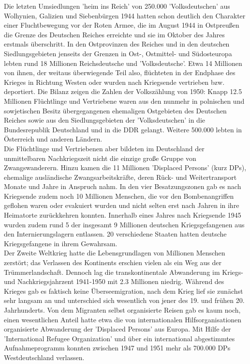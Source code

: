 \documentclass[letterpaper, 12pt]{article}
\begin{document}
Die letzten Umsiedlungen 'heim ins Reich' von 250.000 'Volksdeutschen' aus Wolhynien, Galizien und Siebenbürgen 1944 hatten schon deutlich den Charakter einer Fluchtbewegung vor der Roten Armee, die im August 1944 in Ostpreußen die Grenze des Deutschen Reiches erreichte und sie im Oktober des Jahres erstmals überschritt. In den Ostprovinzen des Reiches und in den deutschen Siedlungsgebieten jenseits der Grenzen in Ost-, Ostmittel- und Südosteuropa lebten rund 18 Millionen Reichsdeutsche und 'Volksdeutsche'. Etwa 14 Millionen von ihnen, der weitaus überwiegende Teil also, flüchteten in der Endphase des Krieges in Richtung Westen oder wurden nach Kriegsende vertrieben bzw. deportiert. Die Bilanz zeigen die Zahlen der Volkszählung von 1950: Knapp 12.5 Millionen Flüchtlinge und Vertriebene waren aus den nunmehr in polnischen und sowjetischen Besitz übergegangenen ehemaligen Ostgebieten des Deutschen Reiches sowie aus den Siedlungsgebieten der 'Volksdeutschen' in die Bundesrepublik Deutschland und in die DDR gelangt. Weitere 500.000 lebten in Österreich und anderen Ländern. \\
Die Flüchtlinge und Vertriebenen aber bildeten im Deutschland der unmittelbaren Nachkriegszeit nicht die einzige große Gruppe von Zwangswanderern. Hinzu kamen die 11 Millionen 'Displaced Persons' (kurz DPs), ehemalige ausländische Zwangsarbeitskräfte, deren Rück- und Weitertransport Monate und Jahre in Anspruch nahm. In den vier Besatzungszonen gab es nach Kriegsende zudem noch 10 Millionen Menschen, die vor den Bombenangriffen geflohen waren oder evakuiert wurden und nicht selten erst nach Jahren in ihre Heimatorte zurückkehren konnten. Innerhalb eines Jahres nach Kriegsende 1945 wurden zudem rund 5 der insgesamt 9 Millionen deutschen Kriegsgefangenen aus den Internierungslagern entlassen. 20 verschiedene Staaten hatten deutsche Kriegsgefangene in ihrem Gewahrsam. \\
Der Zweite Weltkrieg hatte die Lebensgrundlagen von Millionen Menschen zerstört; das Verlassen des Kontinents erschien vielen als ein Weg aus der Trümmerlandschaft. Dennoch lag die transkontinentale Abwanderung im Kriegs- und Nachkriegsjahrzent 1941-1950 mit 2.3 Millionen niedrig. Während des Krieges gab es faktisch keine Überseemigration, nach dem Krieg lief sie zunächst sehr langsam an und unterschied sich wesentlich von jener des 19. und frühen 20. Jahrhunderts. Von dem Migranten selbst organisierte Reisen gab es kaum noch, einen wesentlichen Anteil hatte etwa die von internationalen Hilfsorganisationen organisierte Abwanderung der 'Displaced Persons' aus Europa. Mit Hilfe der 'International Refugee Organization' und über ein international abgestimmtes Aufnahmeprogramm konnten zwischen 1947 und 1951 mehr als 700.000 DPs Westdeutschland verlassen. \\
\end{document}
